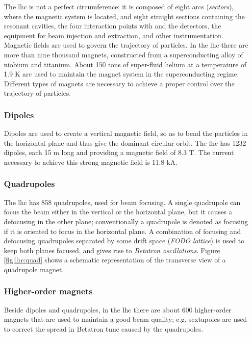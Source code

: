 The \gls{lhc} is not a perfect circumference: it is composed of eight arcs (\textit{sectors}), where the magnetic system is located, and eight straight sections containing the resonant cavities, the four interaction points with and the detectors, the equipment for beam injection and extraction, and other instrumentation. Magnetic fields are used to govern the trajectory of particles. In the \gls{lhc} there are more than nine thousand magnets, constructed from a superconducting alloy of niobium and titanium. About 150 tons of super-fluid helium at a temperature of 1.9 K are used to maintain the magnet system in the superconducting regime. Different types of magnets are necessary to achieve a proper control over the trajectory of particles.

\subsubsection*{Dipoles} 
Dipoles are used to create a vertical magnetic field, so as to bend the particles in the horizontal plane and thus give the dominant circular orbit. The \gls{lhc} has 1232 dipoles, each 15 m long and providing a magnetic field of 8.3 T. The current necessary to achieve this strong magnetic field is 11.8 kA.


\subsubsection*{Quadrupoles}
The \gls{lhc} has 858 quadrupoles, used for beam focusing. A single quadrupole can focus the beam either in the vertical or the horizontal plane, but it causes a defocusing in the other plane; conventionally a quadrupole is denoted as focusing if it is oriented to focus in the horizontal plane. A combination of focusing and defocusing quadrupoles separated by some drift space (\textit{FODO lattice}) is used to keep both planes focused, and gives rise to \textit{Betatron oscillations}. Figure \ref{fig:lhc:quad} shows a schematic representation of the transverse view of a quadrupole magnet.

\subsubsection*{Higher-order magnets} 
Beside dipoles and quadrupoles, in the \gls{lhc} there are about 600 higher-order magnets that are used to maintain a good beam quality; e.g.  sextupoles are used to correct the spread in Betatron tune caused by the quadrupoles.




